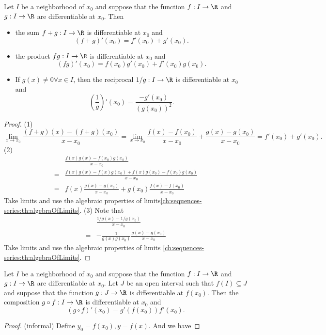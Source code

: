 \begin{refsection}
\begin{lemma}\cite[91]{fitzpatrick2006advanced}
Let $I$ be a neighborhood of $x_0$ and suppose that the function $f:I\to \R$ and $g:I\to \R$ are differentiable at $x_0$. Then
\begin{itemize}
	\item the sum $f+g:I\to \R$ is differentiable at $x_0$ and
	$$(f+g)'(x_0) = f'(x_0) + g'(x_0).$$
	\item the product $fg:I\to \R$ is differentiable at $x_0$ and 
	$$(fg)'(x_0) = f(x_0)g'(x_0) + f'(x_0)g(x_0).$$
	\item If $g(x)\neq 0 \forall x\in I$, then the reciprocal $1/g:I\to \R$ is differentiable at $x_0$ and
	$$(\frac{1}{g})'(x_0) = \frac{-g'(x_0)}{(g(x_0))^2}.$$  
\end{itemize}	
\end{lemma}
\begin{proof}
(1)
$$\lim_{x\to x_0}\frac{(f+g)(x)-(f+g)(x_0)}{x-x_0}=\lim_{x\to x_0}\frac{f(x)-f(x_0)}{x-x_0} + \frac{g(x)-g(x_0)}{x-x_0} = f'(x_0) + g'(x_0).$$
(2)
\begin{align*}
& \frac{f(x)g(x) - f(x_0)g(x_0)}{x-x_0} \\
=& \frac{f(x)g(x) - f(x)g(x_0) + f(x)g(x_0) - f(x_0)g(x_0)}{x-x_0} \\
=& f(x)\frac{g(x) - g(x_0) }{x-x_0} + g(x_0)\frac{ f(x) - f(x_0)}{x-x_0} 
\end{align*}	
Take limits and use the algebraic properties of  limits\autoref{ch:sequences-series:th:algebraOfLimits}.
(3) Note that
\begin{align*}
& \frac{1/g(x) - 1/g(x_0)}{x-x_0} \\
=& -\frac{1}{g(x)g(x_0)}\frac{g(x) - g(x_0)}{x-x_0} 
\end{align*}
Take limits and use the algebraic properties of  limits \autoref{ch:sequences-series:th:algebraOfLimits}.
\end{proof}


\begin{lemma}\cite[99]{fitzpatrick2006advanced}
	Let $I$ be a neighborhood of $x_0$ and suppose that the function $f:I\to \R$ and $g:I\to \R$ are differentiable at $x_0$. Let $J$ be an open interval such that $f(I)\subseteq J$ and suppose that the function $g:J\to \R$ is differentiable at $f(x_0)$. Then
the composition $g\circ f:I\to \R$ is differentiable at $x_0$ and
		$$(g\circ f)'(x_0) = g'(f(x_0))f'(x_0).$$	
\end{lemma}
\begin{proof}(informal)
Define $y_0 = f(x_0), y = f(x)$. And we have


\end{proof}
\end{refsection}
